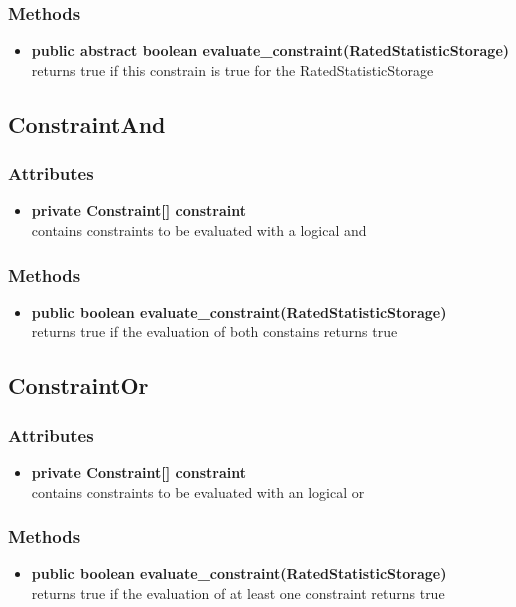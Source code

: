 \subsubsection{Methods}
\begin{itemize}
	\item \textbf{ public abstract boolean evaluate\_constraint(RatedStatisticStorage) }\\
	returns true if this constrain is true for the RatedStatisticStorage
\end{itemize}


\subsection{ConstraintAnd }

\subsubsection{Attributes}
\begin{itemize}
	\item \textbf{ private Constraint[] constraint }\\
	contains constraints to be evaluated with a logical and	
\end{itemize}
\subsubsection{Methods}
\begin{itemize}
	\item \textbf{ public boolean evaluate\_constraint(RatedStatisticStorage) }\\
	returns true if the evaluation of both constains returns true
\end{itemize}


\subsection{ConstraintOr }

\subsubsection{Attributes}
\begin{itemize}
	\item \textbf{ private Constraint[] constraint }\\
	contains constraints to be evaluated with an logical or
\end{itemize}
\subsubsection{Methods}
\begin{itemize}
	\item \textbf{ public boolean evaluate\_constraint(RatedStatisticStorage) }\\
	returns true if the evaluation of at least one constraint returns true
\end{itemize}


